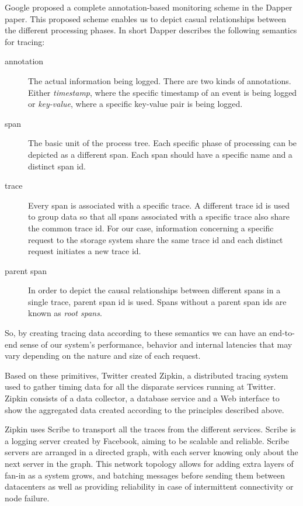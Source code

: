 \documentclass[a4paper,12pt]{article}
\begin{document}
Google proposed a complete annotation-based monitoring scheme in the Dapper 
paper\cite{dapper}. This proposed scheme enables us to depict casual
relationships between the different processing phases. In short Dapper describes
the following semantics for tracing:
\begin{description}
\item[annotation]
The actual information being logged. There are two kinds of annotations. Either
\emph{timestamp}, where the specific timestamp of an event is being logged or 
\emph{key-value}, where a specific key-value pair is being logged.
\item[span]
The basic unit of the process tree. Each specific phase of processing can be 
depicted as a different span. Each span should have a specific name and a 
distinct span id.
\item[trace]
Every span is associated with a specific trace. A different trace id is used 
to group data so that all spans associated with a specific trace also share the
common trace id. For our case, information concerning a specific request to the
storage system share the same trace id and each distinct request initiates a new
trace id.
\item[parent span] 
In order to depict the causal relationships between different spans in a single
trace, parent span id is used. Spans without a parent span ids are  known as 
\emph{root spans}.
\end{description}

So, by creating tracing data according to these semantics we can have an 
end-to-end sense of our system's performance, behavior and internal latencies
that may vary depending on the nature and size of each request.

Based on these primitives, Twitter created Zipkin\cite{zipkin}, a distributed
tracing system used to gather timing data for all the disparate services 
running at Twitter. Zipkin consists of a data collector, a database service and
a Web interface to show the aggregated data created according to the principles
described above.

Zipkin uses Scribe\cite{scribe} to transport all the traces from the different
services. Scribe is a logging server created by Facebook, aiming to be scalable
and reliable. Scribe servers are arranged in a directed graph, with each server
knowing only about the next server in the graph. This network topology allows
for adding extra layers of fan-in as a system grows, and batching messages
before sending them between datacenters as well as providing reliability in case
of intermittent connectivity or node failure.
\end{document}

